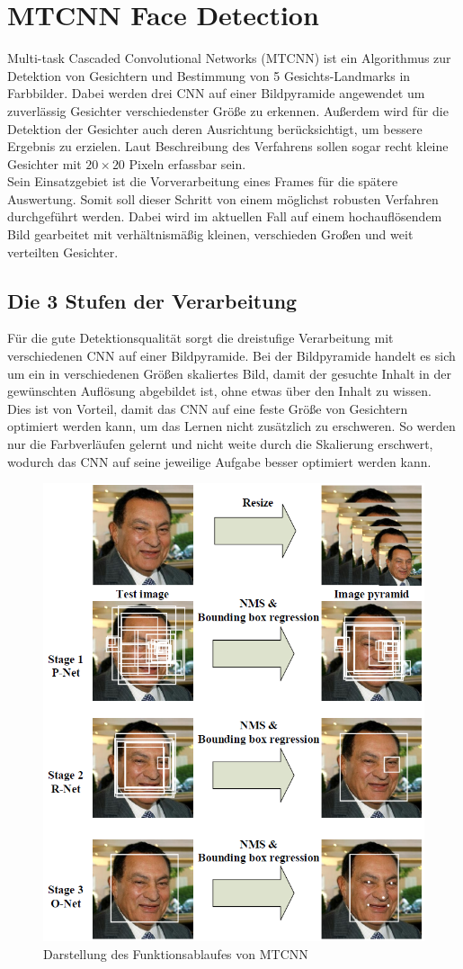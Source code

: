 \section{MTCNN Face Detection}
\label{MTCNN}
Multi-task Cascaded Convolutional Networks (MTCNN) ist ein Algorithmus zur Detektion von Gesichtern und Bestimmung von 5 Gesichts-Landmarks in Farbbilder. Dabei werden drei CNN auf einer Bildpyramide angewendet um zuverlässig Gesichter verschiedenster Größe zu erkennen. Außerdem wird für die Detektion der Gesichter auch deren Ausrichtung berücksichtigt, um bessere Ergebnis zu erzielen. Laut Beschreibung des Verfahrens sollen sogar recht kleine Gesichter mit $20\times 20$ Pixeln erfassbar sein.\\
Sein Einsatzgebiet ist die Vorverarbeitung eines Frames für die spätere Auswertung. Somit soll dieser Schritt von einem möglichst robusten Verfahren durchgeführt werden. Dabei wird im aktuellen Fall auf einem hochauflösendem Bild gearbeitet mit verhältnismäßig kleinen, verschieden Großen und weit verteilten Gesichter.
\subsection{Die 3 Stufen der Verarbeitung}
Für die gute Detektionsqualität sorgt die dreistufige Verarbeitung mit verschiedenen CNN auf einer Bildpyramide. Bei der Bildpyramide handelt es sich um ein in verschiedenen Größen skaliertes Bild, damit der gesuchte Inhalt in der gewünschten Auflösung abgebildet ist, ohne etwas über den Inhalt zu wissen.\\
Dies ist von Vorteil, damit das CNN auf eine feste Größe von Gesichtern optimiert werden kann, um das Lernen nicht zusätzlich zu erschweren. So werden nur die Farbverläufen gelernt und nicht weite durch die Skalierung erschwert, wodurch das CNN auf seine jeweilige Aufgabe besser optimiert werden kann.
\begin{figure}
	\centering
	\includegraphics[width=0.5\linewidth]{img/MTCNN_Step}
	\caption{Darstellung des Funktionsablaufes von MTCNN\cite{MTCCN}}
	\label{img_MTCNN_Step}
\end{figure}
